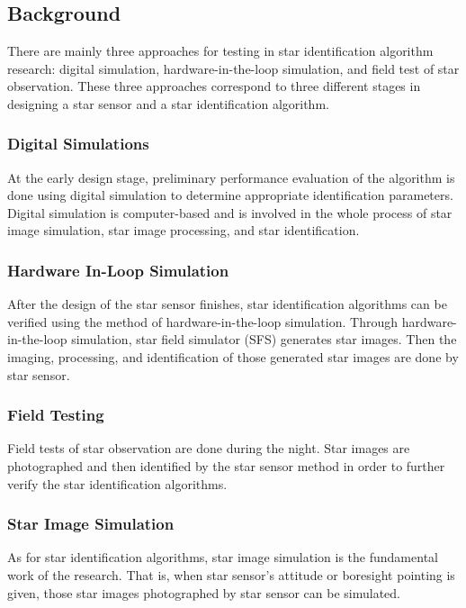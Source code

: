 \documentclass[../../main.tex]{subfiles}
\begin{document}

\newpage
\section{\SM}

\subsection{Background} %
There are mainly three approaches for testing in star identiﬁcation algorithm research: digital simulation, hardware-in-the-loop simulation, and field test of star observation. These three approaches correspond to three different stages in designing a star sensor and a star identiﬁcation algorithm.

\subsubsection{Digital Simulations}
At the early design stage, preliminary performance evaluation of the algorithm is done using digital simulation to determine appropriate identification parameters. Digital simulation is computer-based and is involved in the whole process of star image simulation, star image processing, and star identification. 

\subsubsection{Hardware In-Loop Simulation}
After the design of the star sensor finishes, star identiﬁcation algorithms can be veriﬁed using the method of hardware-in-the-loop simulation. Through hardware-in-the-loop simulation, star ﬁeld simulator (SFS) generates star images. Then the imaging, processing, and identification of those generated star images are done by star sensor. 

\subsubsection{Field Testing}
Field tests of star observation are done during the night. Star images are photographed and then identified by the star sensor method in order to further verify the star identification algorithms. 

\subsubsection{Star Image Simulation}
As for star identiﬁcation algorithms, star image simulation is the fundamental work of the research. That is, when star sensor’s attitude or boresight pointing is given, those star images photographed by star sensor can be simulated.
\end{document}
